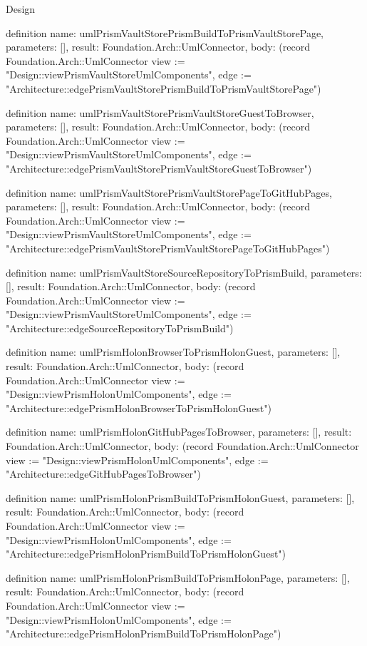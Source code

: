 \begin{lexlean}{Design}
\begin{semanticmodule}
definition{
  name: umlPrismVaultStorePrismBuildToPrismVaultStorePage,
  parameters: [],
  result: Foundation.Arch::UmlConnector,
  body: (record Foundation.Arch::UmlConnector {view := "Design::viewPrismVaultStoreUmlComponents", edge := "Architecture::edgePrismVaultStorePrismBuildToPrismVaultStorePage"})
}

definition{
  name: umlPrismVaultStorePrismVaultStoreGuestToBrowser,
  parameters: [],
  result: Foundation.Arch::UmlConnector,
  body: (record Foundation.Arch::UmlConnector {view := "Design::viewPrismVaultStoreUmlComponents", edge := "Architecture::edgePrismVaultStorePrismVaultStoreGuestToBrowser"})
}

definition{
  name: umlPrismVaultStorePrismVaultStorePageToGitHubPages,
  parameters: [],
  result: Foundation.Arch::UmlConnector,
  body: (record Foundation.Arch::UmlConnector {view := "Design::viewPrismVaultStoreUmlComponents", edge := "Architecture::edgePrismVaultStorePrismVaultStorePageToGitHubPages"})
}

definition{
  name: umlPrismVaultStoreSourceRepositoryToPrismBuild,
  parameters: [],
  result: Foundation.Arch::UmlConnector,
  body: (record Foundation.Arch::UmlConnector {view := "Design::viewPrismVaultStoreUmlComponents", edge := "Architecture::edgeSourceRepositoryToPrismBuild"})
}

definition{
  name: umlPrismHolonBrowserToPrismHolonGuest,
  parameters: [],
  result: Foundation.Arch::UmlConnector,
  body: (record Foundation.Arch::UmlConnector {view := "Design::viewPrismHolonUmlComponents", edge := "Architecture::edgePrismHolonBrowserToPrismHolonGuest"})
}

definition{
  name: umlPrismHolonGitHubPagesToBrowser,
  parameters: [],
  result: Foundation.Arch::UmlConnector,
  body: (record Foundation.Arch::UmlConnector {view := "Design::viewPrismHolonUmlComponents", edge := "Architecture::edgeGitHubPagesToBrowser"})
}

definition{
  name: umlPrismHolonPrismBuildToPrismHolonGuest,
  parameters: [],
  result: Foundation.Arch::UmlConnector,
  body: (record Foundation.Arch::UmlConnector {view := "Design::viewPrismHolonUmlComponents", edge := "Architecture::edgePrismHolonPrismBuildToPrismHolonGuest"})
}

definition{
  name: umlPrismHolonPrismBuildToPrismHolonPage,
  parameters: [],
  result: Foundation.Arch::UmlConnector,
  body: (record Foundation.Arch::UmlConnector {view := "Design::viewPrismHolonUmlComponents", edge := "Architecture::edgePrismHolonPrismBuildToPrismHolonPage"})
}


\end{semanticmodule}
\end{lexlean}
